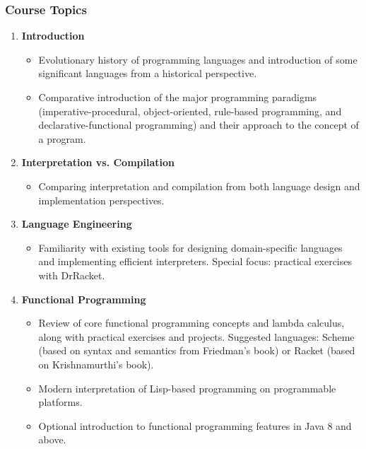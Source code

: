 \documentclass[12pt]{article}
\begin{document}
\subsubsection*{Course Topics}
\begin{enumerate}
    \item \textbf{Introduction}
        \begin{itemize}
            \item Evolutionary history of programming languages and introduction of some significant languages from a historical perspective.
            \item Comparative introduction of the major programming paradigms (imperative-procedural, object-oriented, rule-based programming, and declarative-functional programming) and their approach to the concept of a program.
        \end{itemize}
    
    \item \textbf{Interpretation vs. Compilation}
        \begin{itemize}
            \item Comparing interpretation and compilation from both language design and implementation perspectives.
        \end{itemize}
    
    \item \textbf{Language Engineering}
        \begin{itemize}
            \item Familiarity with existing tools for designing domain-specific languages and implementing efficient interpreters. Special focus: practical exercises with DrRacket.
        \end{itemize}
    
    \item \textbf{Functional Programming}
        \begin{itemize}
            \item Review of core functional programming concepts and lambda calculus, along with practical exercises and projects. Suggested languages: Scheme (based on syntax and semantics from Friedman’s book) or Racket (based on Krishnamurthi’s book).
            \item Modern interpretation of Lisp-based programming on programmable platforms.
            \item Optional introduction to functional programming features in Java 8 and above.
        \end{itemize}
    

\end{enumerate}
\end{document}
